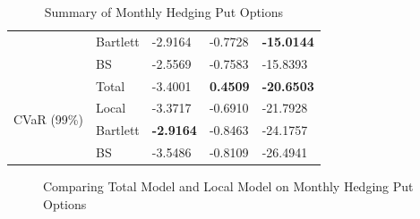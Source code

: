\documentclass[letterpaper,12pt,titlepage,oneside,final]{book}
\numberwithin{equation}{section}
\theoremstyle{definition}
\begin{document}
\begin{table}[htp!]
\begin{tabular}{ll|l|l|l|}
	\multicolumn{1}{|l|}{}                                & Bartlett & -2.9164          & -0.7728          & \textbf{-15.0144} \\  
	\multicolumn{1}{|l|}{}                                & BS       & -2.5569          & -0.7583          & -15.8393          \\ \hline
	\multicolumn{1}{|l|}{\multirow{4}{*}{CVaR (99\%)}}    & Total    & -3.4001          & \textbf{0.4509}  & \textbf{-20.6503} \\  
	\multicolumn{1}{|l|}{}                                & Local    & -3.3717          & -0.6910          & -21.7928          \\  
	\multicolumn{1}{|l|}{}                                & Bartlett & \textbf{-2.9164} & -0.8463          & -24.1757          \\  
	\multicolumn{1}{|l|}{}                                & BS       & -3.5486          & -0.8109          & -26.4941          \\ \hline
	\end{tabular}
	\caption{Summary of Monthly Hedging Put Options}
	\label{table:putTotalM}
	\end{table}


\begin{figure}[htp!]
	\centering

	\caption{Comparing Total Model and Local Model on Monthly Hedging Put Options} \label{fig:putTotalM1}
	\end{figure}
\end{document}
